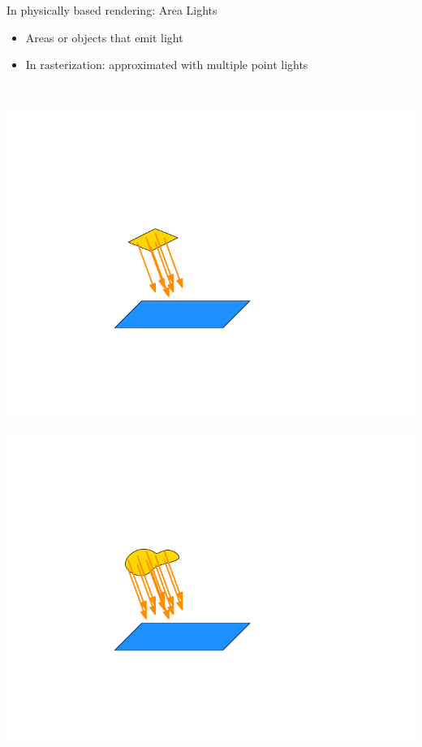 \documentclass[utf8,stillsansserifmath,fleqn,t]{beamer}
\begin{document}
\begin{frame}[label=intro-area-light]
\frametitle{\insertsection}
In physically based rendering: Area Lights
\begin{itemize}
\item Areas or objects that emit light
\item In rasterization: approximated with multiple
point lights
\end{itemize}~\\
\begin{minipage}{.48\textwidth}
    \includegraphics[width=\textwidth]{./fig/lightsource-area-simple.pdf}\hfill
\end{minipage}\hfill
\begin{minipage}{.48\textwidth}
    \includegraphics[width=\textwidth]{./fig/lightsource-area-complex.pdf}
\end{minipage}
\end{frame}
\end{document}
